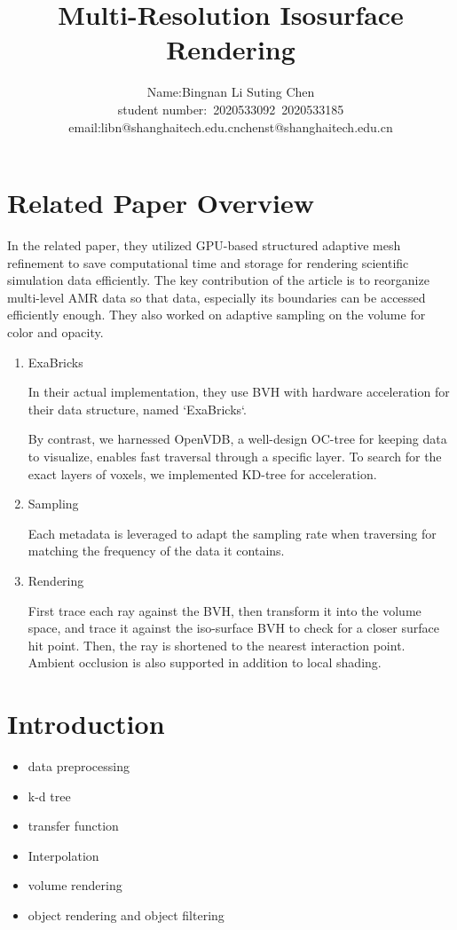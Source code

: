 \documentclass[acmtog]{acmart}
\title{Multi-Resolution Isosurface Rendering}
\author{Name:\quad Bingnan Li \quad Suting Chen \\ student number:\ 2020533092\ 2020533185
\\email:\quad libn@shanghaitech.edu.cn\quad chenst@shanghaitech.edu.cn}
\begin{document}
    \maketitle

    \vspace*{2 ex}


    \section{Related Paper Overview}\label{sec:related-paper-overview}
    In the related paper, they utilized GPU-based structured adaptive mesh refinement to save computational time and storage for rendering scientific simulation data efficiently.
    The key contribution of the article is to reorganize multi-level AMR data so that data, especially its boundaries can be accessed efficiently enough.
    They also worked on adaptive sampling on the volume for color and opacity.
    \begin{enumerate}
        \item ExaBricks
        \par In their actual implementation, they use BVH with hardware acceleration for their data structure, named `ExaBricks`.
        \par By contrast, we harnessed OpenVDB, a well-design OC-tree for keeping data to visualize, enables fast traversal through a specific layer. To search for the exact layers of voxels, we implemented KD-tree for acceleration.
        \item Sampling
        \par Each metadata is leveraged to adapt the sampling rate when traversing for matching the frequency of the data it contains.
        \item Rendering
        \par First trace each ray against the BVH, then transform it into the volume space, and trace it against the iso-surface BVH to check for a closer surface hit point.
        Then, the ray is shortened to the nearest interaction point. Ambient occlusion is also supported in addition to local shading.
    \end{enumerate}


    \section{Introduction}\label{sec:introduction}
    \begin{itemize}
        \item data preprocessing
        \item k-d tree
        \item transfer function
        \item Interpolation
        \item volume rendering
        \item object rendering and object filtering
    \end{itemize}
\end{document}
